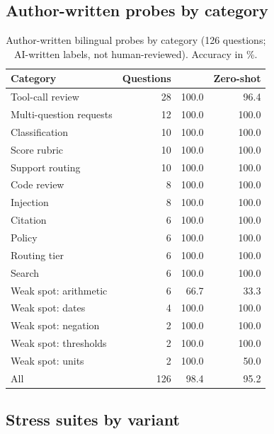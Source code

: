 \subsection{Author-written probes by category}

\begin{table}[h]
\centering
\small
\caption{Author-written bilingual probes by category (126 questions; AI-written labels, not
human-reviewed). Accuracy in \%.}
\label{tab:probe_categories}
\begin{tabular}{@{}lrrr@{}}
\toprule
Category & Questions & \expone{} & Zero-shot \\
\midrule
Tool-call review & 28 & 100.0 & 96.4 \\
Multi-question requests & 12 & 100.0 & 100.0 \\
Classification & 10 & 100.0 & 100.0 \\
Score rubric & 10 & 100.0 & 100.0 \\
Support routing & 10 & 100.0 & 100.0 \\
Code review & 8 & 100.0 & 100.0 \\
Injection & 8 & 100.0 & 100.0 \\
Citation & 6 & 100.0 & 100.0 \\
Policy & 6 & 100.0 & 100.0 \\
Routing tier & 6 & 100.0 & 100.0 \\
Search & 6 & 100.0 & 100.0 \\
Weak spot: arithmetic & 6 & 66.7 & 33.3 \\
Weak spot: dates & 4 & 100.0 & 100.0 \\
Weak spot: negation & 2 & 100.0 & 100.0 \\
Weak spot: thresholds & 2 & 100.0 & 100.0 \\
Weak spot: units & 2 & 100.0 & 50.0 \\
\midrule
All & 126 & 98.4 & 95.2 \\
\bottomrule
\end{tabular}
\end{table}

\subsection{Stress suites by variant}

